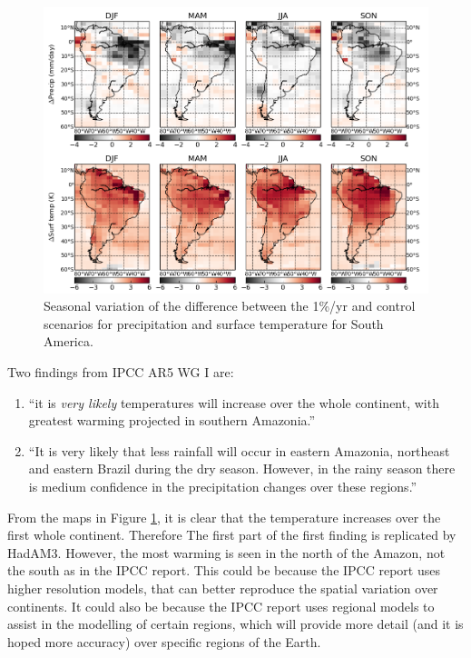 \documentclass{article}
\begin{document}
\begin{figure}[hbp]
    \centering
    \includegraphics[width=\textwidth]{figures/sa_seasonal}
    \caption{Seasonal variation of the difference between the 1\%/yr and control scenarios for precipitation and surface temperature for South America.}
    \label{fig:sa_seasonal}
\end{figure}

Two findings from IPCC AR5 WG I \parencite{ipcc2014wg1} are:
\begin{enumerate}
    \item ``it is \textit{very likely} temperatures will increase over the whole continent, with greatest warming projected in southern Amazonia.''
    \item ``It is very likely that less rainfall will occur in eastern Amazonia, northeast and eastern Brazil during the dry season. However, in the rainy season there is medium confidence in the precipitation changes over these regions.''
\end{enumerate}

From the maps in Figure \ref{fig:sa_seasonal}, it is clear that the temperature increases over the first whole continent. Therefore The first part of the first finding is replicated by HadAM3. However, the most warming is seen in the north of the Amazon, not the south as in the IPCC report. This could be because the IPCC report uses higher resolution models, that can better reproduce the spatial variation over continents. It could also be because the IPCC report uses regional models to assist in the modelling of certain regions, which will provide more detail (and it is hoped more accuracy) over specific regions of the Earth.
\end{document}
